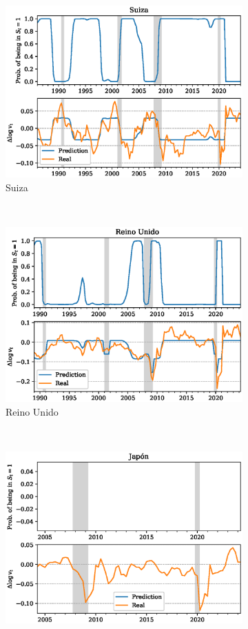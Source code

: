 \documentclass[titlepage, 12pt]{article}
\begin{document}
\begin{figure}
\begin{subfigure}[b]{0.49\textwidth}
        \includegraphics[width=\textwidth]{plots/ch-markov-v.eps}
        \caption{Suiza}
    \end{subfigure}
    ~
    \begin{subfigure}[b]{0.49\textwidth}
        \includegraphics[width=\textwidth]{plots/uk-markov-v.eps}
        \caption{Reino Unido}
    \end{subfigure}
    ~
    \begin{subfigure}[b]{0.49\textwidth}
        \includegraphics[width=\textwidth]{plots/jp-markov-v.eps}

\end{subfigure}
\end{figure}
\end{document}
